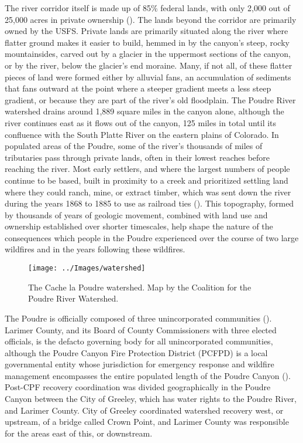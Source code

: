 \documentclass[
]{article}
\begin{document}
The river corridor itself is made up of 85\% federal lands, with only 2,000 out of 25,000 acres in private ownership (). The lands beyond the corridor are primarily owned by the USFS. Private lands are primarily situated along the river where flatter ground makes it easier to build, hemmed in by the canyon's steep, rocky mountainsides, carved out by a glacier in the uppermost sections of the canyon, or by the river, below the glacier's end moraine. Many, if not all, of these flatter pieces of land were formed either by alluvial fans, an accumulation of sediments that fans outward at the point where a steeper gradient meets a less steep gradient, or because they are part of the river's old floodplain. The Poudre River watershed drains around 1,889 square miles in the canyon alone, although the river continues east as it flows out of the canyon, 125 miles in total until its confluence with the South Platte River on the eastern plains of Colorado. In populated areas of the Poudre, some of the river's thousands of miles of tributaries pass through private lands, often in their lowest reaches before reaching the river. Most early settlers, and where the largest numbers of people continue to be based, built in proximity to a creek and prioritized settling land where they could ranch, mine, or extract timber, which was sent down the river during the years 1868 to 1885 to use as railroad ties (). This topography, formed by thousands of years of geologic movement, combined with land use and ownership established over shorter timescales, help shape the nature of the consequences which people in the Poudre experienced over the course of two large wildfires and in the years following these wildfires.

\begin{figure}
\texttt{[image: ../Images/watershed]} \caption[Cache la Poudre watershed]{The Cache la Poudre watershed. Map by the Coalition for the Poudre River Watershed.}\label{fig:figureTitle12}
\end{figure}

The Poudre is officially composed of three unincorporated communities (). Larimer County, and its Board of County Commissioners with three elected officials, is the defacto governing body for all unincorporated communities, although the Poudre Canyon Fire Protection District (PCFPD) is a local governmental entity whose jurisdiction for emergency response and wildfire management encompasses the entire populated length of the Poudre Canyon (). Post-CPF recovery coordination was divided geographically in the Poudre Canyon between the City of Greeley, which has water rights to the Poudre River, and Larimer County. City of Greeley coordinated watershed recovery west, or upstream, of a bridge called Crown Point, and Larimer County was responsible for the areas east of this, or downstream.
\end{document}
